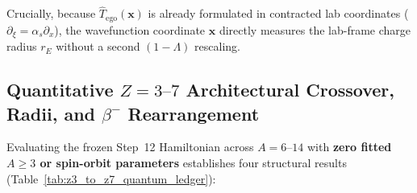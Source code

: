\documentclass[11pt, a4paper]{article}
\begin{document}
Crucially, because $\hat{T}_{\mathrm{ego}}(\mathbf{x})$ is already formulated in contracted lab coordinates ($\partial_\xi = \alpha_s\partial_x$), the wavefunction coordinate $\mathbf{x}$ directly measures the lab-frame charge radius $r_E$ without a second $(1 - \Lambda)$ rescaling.

\subsection{\texorpdfstring{Quantitative $Z = 3\text{--}7$ Architectural Crossover, Radii, and $\beta^-$ Rearrangement}{Quantitative Z = 3--7 Architectural Crossover, Radii, and Beta Rearrangement}}
Evaluating the frozen Step~12 Hamiltonian across $A = 6\text{--}14$ with \textbf{zero fitted $A \ge 3$ or spin-orbit parameters} establishes four structural results (Table~\ref{tab:z3_to_z7_quantum_ledger}):
\end{document}
